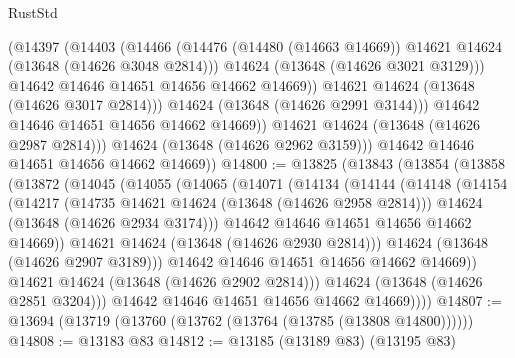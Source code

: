 \begin{lexlean}{RustStd}
\begin{coremodule}
                    (@14397
                      (@14403
                        (@14466
                          (@14476
                            (@14480 (@14663 @14669))
                            @14621
                            @14624
                            (@13648 (@14626 @3048 @2814)))
                          @14624
                          (@13648 (@14626 @3021 @3129)))
                        @14642
                        @14646
                        @14651
                        @14656
                        @14662
                        @14669))
                    @14621
                    @14624
                    (@13648 (@14626 @3017 @2814)))
                  @14624
                  (@13648 (@14626 @2991 @3144)))
                @14642
                @14646
                @14651
                @14656
                @14662
                @14669))
            @14621
            @14624
            (@13648 (@14626 @2987 @2814)))
          @14624
          (@13648 (@14626 @2962 @3159)))
        @14642
        @14646
        @14651
        @14656
        @14662
        @14669))
@14800 := @13825
    (@13843
      (@13854
        (@13858
          (@13872
            (@14045
              (@14055
                (@14065
                  (@14071
                    (@14134
                      (@14144
                        (@14148
                          (@14154
                            (@14217
                              (@14735 @14621 @14624 (@13648 (@14626 @2958 @2814)))
                              @14624
                              (@13648 (@14626 @2934 @3174)))
                            @14642
                            @14646
                            @14651
                            @14656
                            @14662
                            @14669))
                        @14621
                        @14624
                        (@13648 (@14626 @2930 @2814)))
                      @14624
                      (@13648 (@14626 @2907 @3189)))
                    @14642
                    @14646
                    @14651
                    @14656
                    @14662
                    @14669))
                @14621
                @14624
                (@13648 (@14626 @2902 @2814)))
              @14624
              (@13648 (@14626 @2851 @3204)))
            @14642
            @14646
            @14651
            @14656
            @14662
            @14669))))
@14807 := @13694 (@13719 (@13760 (@13762 (@13764 (@13785 (@13808 @14800))))))
@14808 := @13183 @83
@14812 := @13185 (@13189 @83) (@13195 @83)

\end{coremodule}
\end{lexlean}

